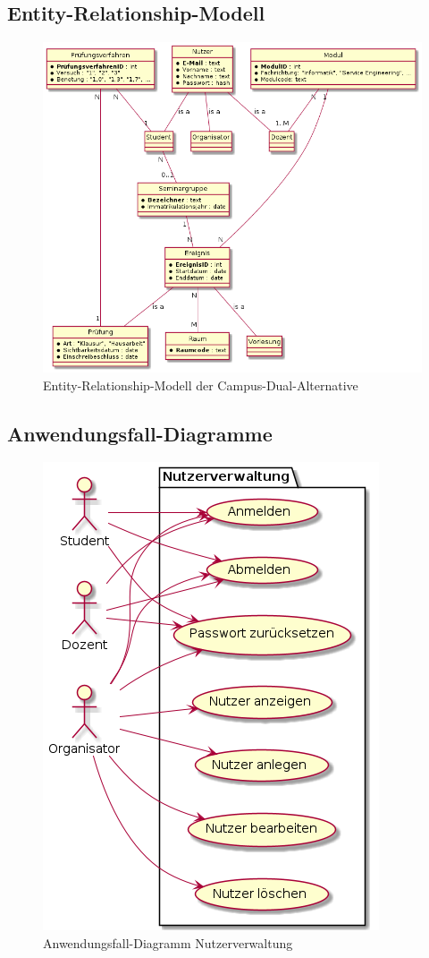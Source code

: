 \documentclass[12pt, a4paper]{scrartcl}
\begin{document}
\subsection{Entity-Relationship-Modell}
\begin{figure}[h]
	\centering
	\includegraphics[width=\textwidth]{erm.png}
	\caption{Entity-Relationship-Modell der Campus-Dual-Alternative}
\end{figure}

\newpage
\subsection{Anwendungsfall-Diagramme}
\begin{figure}[h]
	\centering
	\includegraphics[width=.6\textwidth]{usecase_nv.png}
	\caption{Anwendungsfall-Diagramm Nutzerverwaltung}
\end{figure}
\end{document}
